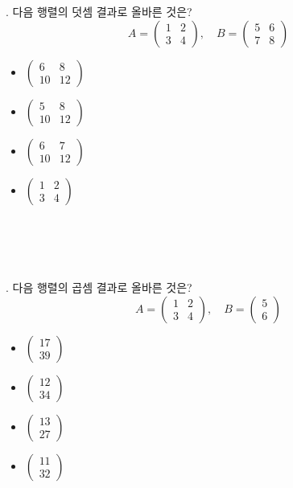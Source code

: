 \documentclass[fleqn]{article}
\begin{document}
      
. 다음 행렬의 덧셈 결과로 올바른 것은?  
\[
A = \begin{pmatrix} 1 & 2 \\ 3 & 4 \end{pmatrix}, \quad B = \begin{pmatrix} 5 & 6 \\ 7 & 8 \end{pmatrix}
\]  
\begin{itemize}
    \item [(A)] \(\begin{pmatrix} 6 & 8 \\ 10 & 12 \end{pmatrix}\)
    \item [(B)] \(\begin{pmatrix} 5 & 8 \\ 10 & 12 \end{pmatrix}\)
    \item [(C)] \(\begin{pmatrix} 6 & 7 \\ 10 & 12 \end{pmatrix}\)
    \item [(D)] \(\begin{pmatrix} 1 & 2 \\ 3 & 4 \end{pmatrix}\)
\end{itemize}\\\\\\\\

. 다음 행렬의 곱셈 결과로 올바른 것은?  
\[
A = \begin{pmatrix} 1 & 2 \\ 3 & 4 \end{pmatrix}, \quad B = \begin{pmatrix} 5 \\ 6 \end{pmatrix}
\]  
\begin{itemize}
    \item [(A)] \(\begin{pmatrix} 17 \\ 39 \end{pmatrix}\)
    \item [(B)] \(\begin{pmatrix} 12 \\ 34 \end{pmatrix}\)
    \item [(C)] \(\begin{pmatrix} 13 \\ 27 \end{pmatrix}\)
    \item [(D)] \(\begin{pmatrix} 11 \\ 32 \end{pmatrix}\)
\end{itemize}\\\\\\\\
\end{document}
